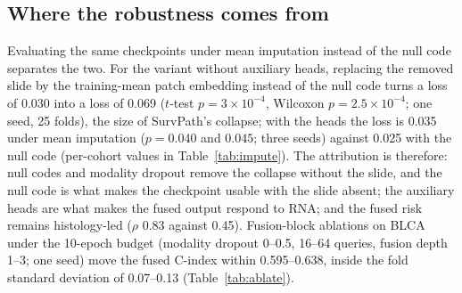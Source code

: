 \documentclass{article}
\newcommand{\cindex}{C-index}
\begin{document}
\subsection{Where the robustness comes from}
\label{sec:where}
Evaluating the same checkpoints under mean imputation instead of the null code separates the two. For the variant without auxiliary heads, replacing the removed slide by the training-mean patch embedding instead of the null code turns a loss of 0.030 into a loss of 0.069 ($t$-test $p = 3 \times 10^{-4}$, Wilcoxon $p = 2.5 \times 10^{-4}$; one seed, 25 folds), the size of SurvPath's collapse; with the heads the loss is 0.035 under mean imputation ($p = 0.040$ and $0.045$; three seeds) against 0.025 with the null code (per-cohort values in Table~\ref{tab:impute}). The attribution is therefore: null codes and modality dropout remove the collapse without the slide, and the null code is what makes the checkpoint usable with the slide absent; the auxiliary heads are what makes the fused output respond to RNA; and the fused risk remains histology-led ($\rho$ 0.83 against 0.45). Fusion-block ablations on BLCA under the 10-epoch budget (modality dropout 0--0.5, 16--64 queries, fusion depth 1--3; one seed) move the fused \cindex{} within 0.595--0.638, inside the fold standard deviation of 0.07--0.13 (Table~\ref{tab:ablate}).
\end{document}
